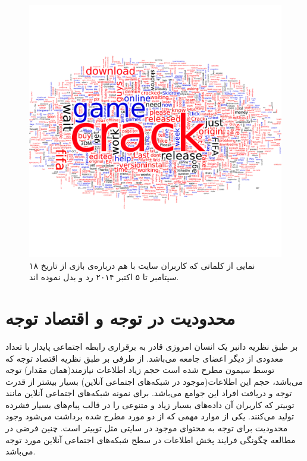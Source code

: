 { \begin{figure}[H]
 \centering
 \includegraphics[scale=0.5]{figures/others/fifa15}
 \caption[خبر انتشار بازی میان کاربران سایت تورنت]
 {نمایی از  کلماتی که کاربران سایت
 \href{https://kickass.to/fifa-15-ultimate-team-edition-sc-t9600660.html\#comment}{}
 با هم درباره‌ی بازی  از تاریخ ۱۸ سپتامبر تا ۵ اکتبر ۲۰۱۴ رد و بدل نموده اند.
 }
\end{figure}


}

\section{ محدودیت در توجه و اقتصاد توجه}
\begin {persian}
\noindent
بر طبق نظریه دانبر \cite{dunbar_social_1998}‌یک انسان امروزی قادر به برقراری رابطه اجتماعی پایدار با تعداد معدودی از دیگر اعضای جامعه می‌باشد. از طرفی بر طبق نظریه اقتصاد توجه که توسط سیمون \cite{lilian_weng_information_2014,simon_designing_1971} مطرح شده است حجم زیاد اطلاعات نیازمند(همان مقدار) توجه می‌باشد، حجم این اطلاعات(موجود در شبکه‌های اجتماعی آنلاین) بسیار بیشتر از قدرت توجه و دریافت افراد این جوامع می‌باشد. برای نمونه شبکه‌های اجتماعی آنلاین مانند توییتر که کاربران آن داده‌های بسیار زیاد و متنوعی را در قالب پیام‌های بسیار فشرده تولید می‌کنند.‌ یکی از موارد مهمی‌ که از دو مورد مطرح شده برداشت می‌شود وجود محدودیت برای توجه به محتوای موجود در سایتی مثل توییتر است. چنین فرضی در مطالعه چگونگی فرایند پخش اطلاعات در سطح شبکه‌های اجتماعی آنلاین مورد توجه می‌باشد.

\end{persian}


